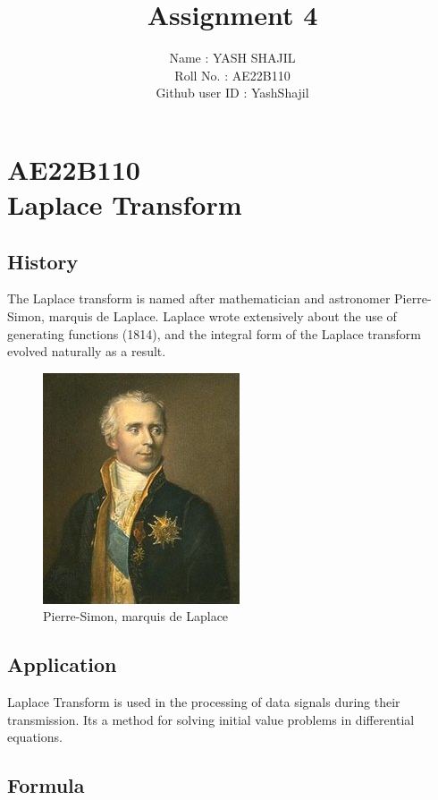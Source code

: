 \documentclass{article}
\title{Assignment 4}
\author{Name : YASH SHAJIL \\Roll No. : AE22B110 \\Github user ID : YashShajil}
\date{}
\begin{document}
\maketitle

\section*{AE22B110 \\ Laplace Transform}

\subsection*{History}

The Laplace transform is named after mathematician and astronomer Pierre-Simon, marquis de Laplace.
Laplace wrote extensively about the use of generating functions (1814), and the integral form of the Laplace transform evolved naturally as a result. ~\cite{enwiki:1158213292}

\begin{figure}[h]
    \centering
    \includegraphics[width = 0.4 \textwidth]{Laplace,_Pierre-Simon,_marquis_de.jpg}
    \caption{Pierre-Simon, marquis de Laplace}
    \label{Pierre-Simon, marquis de Laplace}
\end{figure}

\subsection*{Application}

Laplace Transform is used in the processing of data signals during their transmission. Its a method for solving initial value problems in differential equations. 

\subsection*{Formula}
\end{document}
